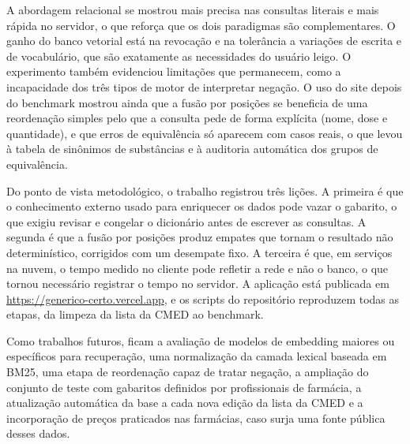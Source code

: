 \documentclass[12pt,oneside,a4paper,english,brazil]{abntex2}
\begin{document}
A abordagem relacional se mostrou mais precisa nas consultas literais e mais rápida no servidor, o que reforça que os dois paradigmas são complementares. O ganho do banco vetorial está na revocação e na tolerância a variações de escrita e de vocabulário, que são exatamente as necessidades do usuário leigo. O experimento também evidenciou limitações que permanecem, como a incapacidade dos três tipos de motor de interpretar negação. O uso do site depois do benchmark mostrou ainda que a fusão por posições se beneficia de uma reordenação simples pelo que a consulta pede de forma explícita (nome, dose e quantidade), e que erros de equivalência só aparecem com casos reais, o que levou à tabela de sinônimos de substâncias e à auditoria automática dos grupos de equivalência.

Do ponto de vista metodológico, o trabalho registrou três lições. A primeira é que o conhecimento externo usado para enriquecer os dados pode vazar o gabarito, o que exigiu revisar e congelar o dicionário antes de escrever as consultas. A segunda é que a fusão por posições produz empates que tornam o resultado não determinístico, corrigidos com um desempate fixo. A terceira é que, em serviços na nuvem, o tempo medido no cliente pode refletir a rede e não o banco, o que tornou necessário registrar o tempo no servidor. A aplicação está publicada em \url{https://generico-certo.vercel.app}, e os scripts do repositório reproduzem todas as etapas, da limpeza da lista da CMED ao benchmark.

Como trabalhos futuros, ficam a avaliação de modelos de embedding maiores ou específicos para recuperação, uma normalização da camada lexical baseada em BM25, uma etapa de reordenação capaz de tratar negação, a ampliação do conjunto de teste com gabaritos definidos por profissionais de farmácia, a atualização automática da base a cada nova edição da lista da CMED e a incorporação de preços praticados nas farmácias, caso surja uma fonte pública desses dados.

\postextual

\end{document}
